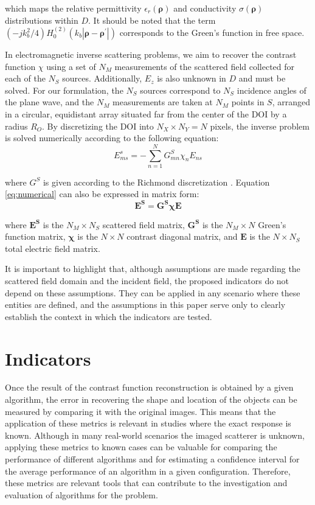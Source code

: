 \documentclass{IEEEtran}
\newcommand{\brho}{\boldsymbol{\rho}}
\newcommand{\brhop}{\boldsymbol{\rho^\prime}}
\newcommand{\Es}{\mathbf{E^S}}
\newcommand{\GS}{\mathbf{G^S}}
\newcommand{\X}{\boldsymbol{\chi}}
\newcommand{\E}{\mathbf{E}}
\begin{document}
		\noindent which maps the relative permittivity $\epsilon_r(\brho)$ and conductivity $\sigma(\brho)$ distributions within $D$. It should be noted that the term $(-jk_b^2/4) H_0^{(2)}(k_b|\brho-\brhop|)$ corresponds to the Green's function in free space.
		
		In electromagnetic inverse scattering problems, we aim to recover the contrast function $\chi$ using a set of $N_M$ measurements of the scattered field collected for each of the $N_S$ sources. Additionally, $E_z$ is also unknown in $D$ and must be solved. For our formulation, the $N_S$ sources correspond to $N_S$ incidence angles of the plane wave, and the $N_M$ measurements are taken at $N_M$ points in $S$, arranged in a circular, equidistant array situated far from the center of the DOI by a radius $R_O$. By discretizing the DOI into $N_X \times N_Y = N$ pixels, the inverse problem is solved numerically according to the following equation:
		\begin{equation}
			E^s_{ms} = - \sum\limits_{n=1}^{N} G^S_{mn}\chi_{n}E_{ns} \label{eq:numerical}
		\end{equation}
		
		\noindent where $G^S$ is given according to the Richmond discretization \cite{richmond1965scattering, pastorino2010ch3}. Equation \eqref{eq:numerical} can also be expressed in matrix form:
		\begin{equation}
			\Es = \GS\X\E
		\end{equation}
		
		\noindent where $\Es$ is the $N_M \times N_S$ scattered field matrix, $\GS$ is the $N_M \times N$ Green's function matrix, $\X$ is the $N \times N$ contrast diagonal matrix, and $\E$ is the $N \times N_S$ total electric field matrix.
		
		It is important to highlight that, although assumptions are made regarding the scattered field domain and the incident field, the proposed indicators do not depend on these assumptions. They can be applied in any scenario where these entities are defined, and the assumptions in this paper serve only to clearly establish the context in which the indicators are tested.
	
	\section{Indicators}\label{sec:indicators}

		
		Once the result of the contrast function reconstruction is obtained by a given algorithm, the error in recovering the shape and location of the objects can be measured by comparing it with the original images. This means that the application of these metrics is relevant in studies where the exact response is known. Although in many real-world scenarios the imaged scatterer is unknown, applying these metrics to known cases can be valuable for comparing the performance of different algorithms and for estimating a confidence interval for the average performance of an algorithm in a given configuration. Therefore, these metrics are relevant tools that can contribute to the investigation and evaluation of algorithms for the problem.
		
\end{document}
